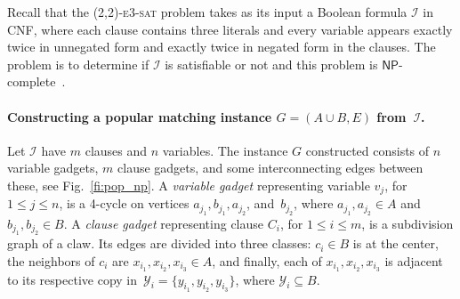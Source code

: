 \documentclass[11pt]{llncs}
\begin{document}
Recall that the \textsc{(2,2)-e3-sat} problem takes as its input a Boolean formula $\mathcal{I}$ in CNF, where each clause contains 
three literals and every variable appears exactly twice in unnegated form and exactly twice in negated form in the clauses. The problem 
is to determine if $\mathcal{I}$ is satisfiable or not and this problem is $\mathsf{NP}$-complete~\cite{BKS03}.

\paragraph{Constructing a popular matching instance $G = (A \cup B,E)$ from~$\mathcal{I}$.}
Let $\mathcal{I}$ have $m$ clauses and $n$ variables. The instance $G$ constructed consists of $n$ variable gadgets, $m$ clause gadgets, and some interconnecting edges between these, see Fig.~\ref{fi:pop_np}. A \emph{variable gadget} representing variable $v_j$, for $1\leq j\leq n$, is a 4-cycle on vertices 
$a_{j_1},  b_{j_1}, a_{j_2}$, and~$b_{j_2}$, where $a_{j_1},a_{j_2}\in A$ and $b_{j_1},b_{j_2}\in B$. 
A \emph{clause gadget} representing clause $C_i$, for $1 \le i \leq m$, is a subdivision graph of a claw. Its 
edges are divided into three classes: $c_i \in B$ is at the center, the neighbors of $c_i$ are $x_{i_1}, x_{i_2}, x_{i_3} \in A$, and 
finally, each of $x_{i_1}, x_{i_2}, x_{i_3}$ is adjacent to its respective copy in~$\mathcal{Y}_i = \{y_{i_1}, y_{i_2},y_{i_3}\}$, where 
$\mathcal{Y}_i \subseteq B$.
\end{document}
